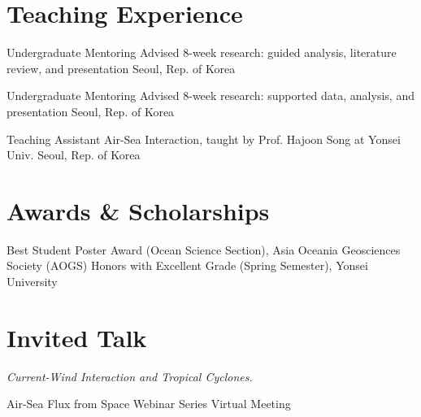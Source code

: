 \documentclass[11pt,usletter,sans]{moderncv}
\begin{document}

\section{Teaching Experience}
        {Undergraduate Mentoring}
        {Advised 8-week research: guided analysis, literature review, and presentation}
        {Seoul, Rep. of Korea}
        {}
        {}
        
\vspace{0.5em}

        {Undergraduate Mentoring}
        {Advised 8-week research: supported data, analysis, and presentation}
        {Seoul, Rep. of Korea}
        {}
        {}
        
\vspace{0.5em}

        {Teaching Assistant}
        {Air-Sea Interaction, taught by Prof. Hajoon Song at Yonsei Univ.}
        {Seoul, Rep. of Korea}
        {}
        {}


\section{Awards \& Scholarships}
       {Best Student Poster Award (Ocean Science Section), 
       Asia Oceania Geosciences Society (AOGS)}
       {Honors with Excellent Grade (Spring Semester), Yonsei University}

\section{Invited Talk}
    
        {\parbox[t]{0.8\textwidth}{\textit{Current-Wind Interaction and Tropical Cyclones.}}}
        {Air-Sea Flux from Space Webinar Series}      %
        {Virtual Meeting}             %
        {}                           %
        {}                           %

\end{document}

